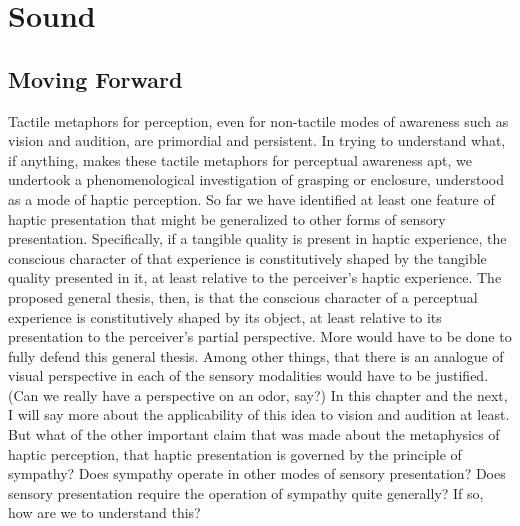 \chapter{Sound} %
\label{cha:sound}

\section{Moving Forward} %
\label{sec:moving_forward}

Tactile metaphors for perception, even for non-tactile modes of awareness such as vision and audition, are primordial and persistent. In trying to understand what, if anything, makes these tactile metaphors for perceptual awareness apt, we undertook a phenomenological investigation of grasping or enclosure, understood as a mode of haptic perception. So far we have identified at least one feature of haptic presentation that might be generalized to other forms of sensory presentation. Specifically, if a tangible quality is present in haptic experience, the conscious character of that experience is constitutively shaped by the tangible quality presented in it, at least relative to the perceiver's haptic experience. The proposed general thesis, then, is that the conscious character of a perceptual experience is constitutively shaped by its object, at least relative to its presentation to the perceiver's partial perspective. More would have to be done to fully defend this general thesis. Among other things, that there is an analogue of visual perspective in each of the sensory modalities would have to be justified. (Can we really have a perspective on an odor, say?) In this chapter and the next, I will say more about the applicability of this idea to vision and audition at least. But what of the other important claim that was made about the metaphysics of haptic perception, that haptic presentation is governed by the principle of sympathy? Does sympathy operate in other modes of sensory presentation? Does sensory presentation require the operation of sympathy quite generally? If so, how are we to understand this?

